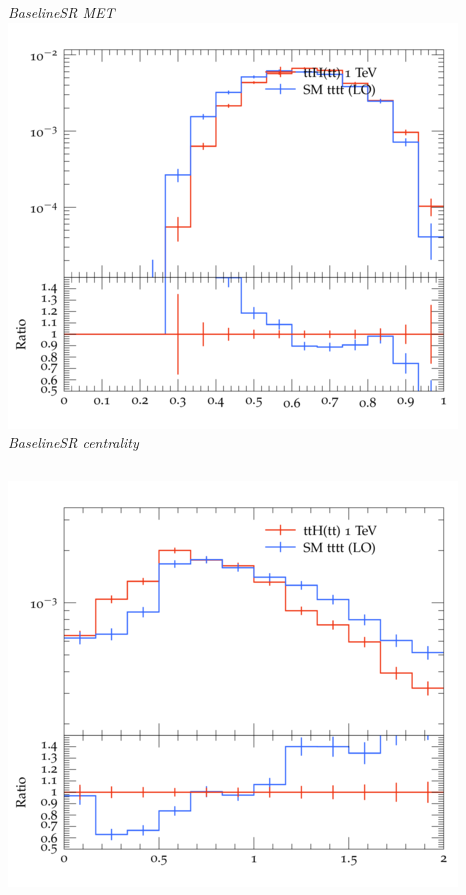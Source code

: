 \documentclass{beamer}
\begin{document}
\begin{frame}
\begin{columns}
\textit{\small BaselineSR MET}
\includegraphics[width=\textwidth]{../plots/ttH_1000/tttt_ttH_1LOS/BaselineSR_centrality.png}\\
\textit{\small BaselineSR centrality}
\end{columns}
\begin{columns}
\includegraphics[width=\textwidth]{../plots/ttH_1000/tttt_ttH_1LOS/BaselineSR_deltaR_bl_min.png}\\

\end{columns}
\end{frame}
\end{document}
